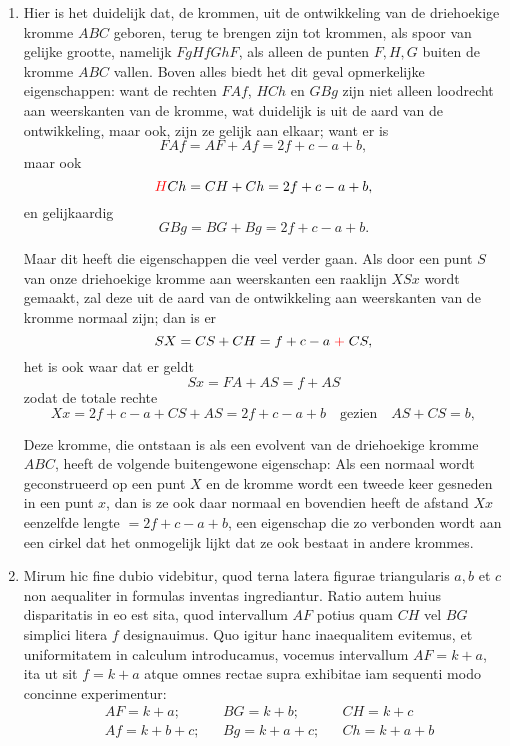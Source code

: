\documentclass[10pt,a4paper]{article}
\newcommand{\switchenum}{\setcounter{enumi}{\arabic{enumi}-1}\switchcolumn}
\begin{document}
\begin{paracol}{2}
\begin{enumerate}[topsep=1px]
		\switchenum
		\item Hier is het duidelijk dat, de krommen, uit de ontwikkeling van de driehoekige kromme $ABC$ geboren, terug te brengen zijn tot krommen, als spoor van gelijke grootte, namelijk $FgHfGhF$, als alleen de punten $F, H, G$ buiten de kromme $ABC$ vallen. Boven alles biedt het dit geval opmerkelijke eigenschappen: want de rechten $FAf$, $HCh$ en $GBg$ zijn niet alleen loodrecht aan weerskanten van de kromme, wat duidelijk is uit de aard van de ontwikkeling, maar ook, zijn ze gelijk aan elkaar; want er is
		\[
			F A f = AF + Af = 2f + c - a + b,
		\]
		maar ook
		\[
			{\color{red}H} C h = CH + Ch = 2f + c - a + b,
		\]
		en gelijkaardig
		\[
			G B g = BG + Bg = 2f + c - a + b.
		\]
		\par Maar dit heeft die eigenschappen die veel verder gaan. Als door een punt $S$ van onze driehoekige kromme aan weerskanten een raaklijn $XSx$ wordt gemaakt, zal deze uit de aard van de ontwikkeling aan weerskanten van de kromme normaal zijn; dan is er 		
		\[
			SX = CS + CH = f + c - a {\color{red}\;+\;} CS,
		\]
		het is ook waar dat er geldt
		\[
			Sx = FA + AS = f + AS
		\]
		zodat de totale rechte
		\[
			Xx = 2f + c - a + CS + AS = 2f + c - a + b \quad\text{gezien}\quad AS + CS = b,
		\]
		\par Deze kromme, die ontstaan is als een evolvent van de driehoekige kromme $ABC$, heeft de volgende buitengewone eigenschap: Als een normaal wordt geconstrueerd op een punt $X$ en de kromme wordt een tweede keer gesneden in een punt $x$, dan is ze ook daar normaal en bovendien heeft de afstand $Xx$ eenzelfde lengte $= 2f+c-a+b$, een eigenschap die zo verbonden wordt aan een cirkel dat het onmogelijk lijkt dat ze ook bestaat in andere krommes.
		
		\switchcolumn*
		
		\item Mirum hic fine dubio videbitur, quod terna latera figurae triangularis $a,b$ et $c$ non aequaliter in formulas inventas ingrediantur. Ratio autem huius disparitatis in eo est sita, quod intervallum $AF$ potius quam $CH$ vel $BG$ simplici litera $f$ designauimus. Quo igitur hanc inaequalitem evitemus, et uniformitatem in calculum introducamus, vocemus intervallum $AF = k+a$, ita ut sit $f=k+a$ atque omnes rectae supra exhibitae iam sequenti modo concinne experimentur:
		\begin{align*}
			&AF = k+a;  &&BG = k+b;   &&CH = k+c\\
			&Af = k+b+c;  &&Bg = k+a+c; &&Ch = k+a+b
		\end{align*}
		

\end{enumerate}
\end{paracol}
\end{document}
